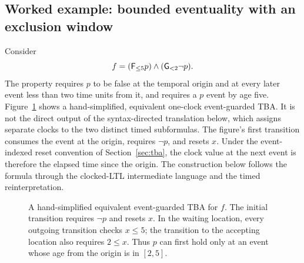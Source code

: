 \subsection{Worked example: bounded eventuality with an exclusion window}
\label{subsec:worked-translation}
Consider
\[
  f=(\mathsf{F}_{\le5}p)\land(\mathsf{G}_{<2}\neg p).
\]
The property requires $p$ to be false at the temporal origin and at every
later event less than two time units from it, and requires a $p$ event by age
five. Figure~\ref{fig:translation-reference-tba} shows a hand-simplified,
equivalent one-clock event-guarded TBA. It is not the direct output of the
syntax-directed translation below, which assigns separate clocks to the two
distinct timed subformulas. The figure's first transition consumes the event
at the origin, requires $\neg p$, and resets $x$. Under the event-indexed
reset convention of Section~\ref{sec:tba}, the clock value at the next event
is therefore the elapsed time since the origin. The construction below
follows the formula through the clocked-LTL intermediate language and the
timed reinterpretation.

\begin{figure}[t]
\centering
\resizebox{0.88\columnwidth}{!}{}
\caption{A hand-simplified equivalent event-guarded TBA for $f$. The initial transition
requires $\neg p$ and resets $x$. In the waiting location, every outgoing
transition checks $x\le5$; the transition to the accepting location also
requires $2\le x$. Thus $p$ can first hold only at an event whose age from
the origin is in $[2,5]$.}
\label{fig:translation-reference-tba}
\end{figure}

